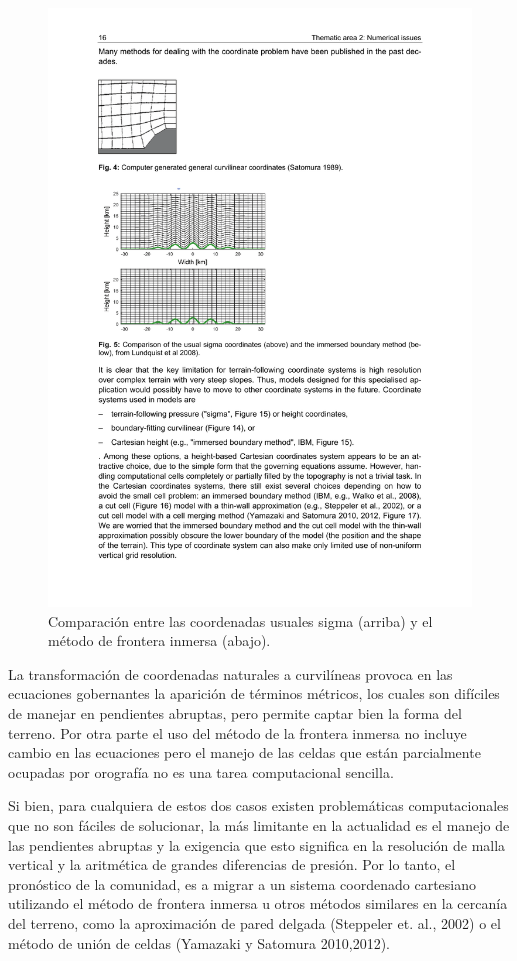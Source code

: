  
\begin{figure}[h!]
	\centering
	\includegraphics[width=0.8\linewidth,trim={2.6cm 13.5cm 9.2cm 9cm},clip]{Imagenes/02/coordinates}
	\caption{Comparación entre las coordenadas usuales sigma (arriba) y el método de frontera inmersa (abajo).}
	\label{fig:02_coordinates}
\end{figure}
La transformación de coordenadas naturales a curvilíneas provoca en las ecuaciones gobernantes la aparición de términos métricos, los cuales son difíciles de manejar en pendientes abruptas, pero permite captar bien la forma del terreno. Por otra parte el uso del método de la frontera inmersa no incluye cambio en las ecuaciones pero el manejo de las celdas que están parcialmente ocupadas por orografía no es una tarea computacional sencilla.

Si bien, para cualquiera de estos dos casos existen problemáticas computacionales que no son fáciles de solucionar, la más limitante en la actualidad es el manejo de las pendientes abruptas y la exigencia que esto significa en la resolución de malla vertical y la aritmética de grandes diferencias de presión. Por lo tanto, el pronóstico de la comunidad, es a migrar a un sistema coordenado cartesiano utilizando el método de frontera inmersa u otros métodos similares en la cercanía del terreno, como la aproximación de pared delgada (Steppeler et. al., 2002) o el método de unión de celdas (Yamazaki y Satomura 2010,2012).

